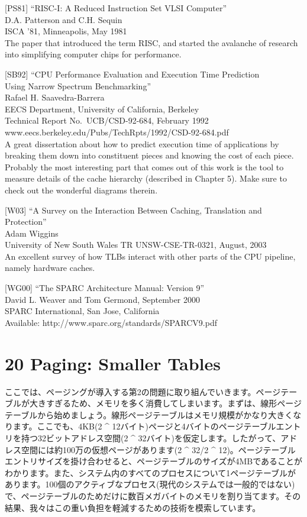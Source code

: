 {[}PS81{]} ``RISC-I: A Reduced Instruction Set VLSI Computer''\\
D.A. Patterson and C.H. Sequin\\
ISCA '81, Minneapolis, May 1981\\
The paper that introduced the term RISC, and started the avalanche of
research into simplifying computer chips for performance.

{[}SB92{]} ``CPU Performance Evaluation and Execution Time Prediction\\
Using Narrow Spectrum Benchmarking''\\
Rafael H. Saavedra-Barrera\\
EECS Department, University of California, Berkeley\\
Technical Report No.~UCB/CSD-92-684, February 1992\\
www.eecs.berkeley.edu/Pubs/TechRpts/1992/CSD-92-684.pdf\\
A great dissertation about how to predict execution time of applications
by breaking them down into constituent pieces and knowing the cost of
each piece. Probably the most interesting part that comes out of this
work is the tool to measure details of the cache hierarchy (described in
Chapter 5). Make sure to check out the wonderful diagrams therein.

{[}W03{]} ``A Survey on the Interaction Between Caching, Translation and
Protection''\\
Adam Wiggins\\
University of New South Wales TR UNSW-CSE-TR-0321, August, 2003\\
An excellent survey of how TLBs interact with other parts of the CPU
pipeline, namely hardware caches.

{[}WG00{]} ``The SPARC Architecture Manual: Version 9''\\
David L. Weaver and Tom Germond, September 2000\\
SPARC International, San Jose, California\\
Available: http://www.sparc.org/standards/SPARCV9.pdf

\hypertarget{paging-smaller-tables}{%
\section*{20 Paging: Smaller Tables}\label{paging-smaller-tables}}

ここでは、ページングが導入する第2の問題に取り組んでいきます。ページテーブルが大きすぎるため、メモリを多く消費してしまいます。まずは、線形ページテーブルから始めましょう。線形ページテーブルはメモリ規模がかなり大きくなります。ここでも、4KB(2
\^{}
12バイト)ページと4バイトのページテーブルエントリを持つ32ビットアドレス空間(2
\^{}
32バイト)を仮定します。したがって、アドレス空間には約100万の仮想ページがあります(2
\^{} 32/2 \^{}
12)。ページテーブルエントリサイズを掛け合わせると、ページテーブルのサイズが4MBであることがわかります。また、システム内のすべてのプロセスについて1ページテーブルがあります。100個のアクティブなプロセス(現代のシステムでは一般的ではない)で、ページテーブルのためだけに数百メガバイトのメモリを割り当てます。その結果、我々はこの重い負担を軽減するための技術を模索しています。

